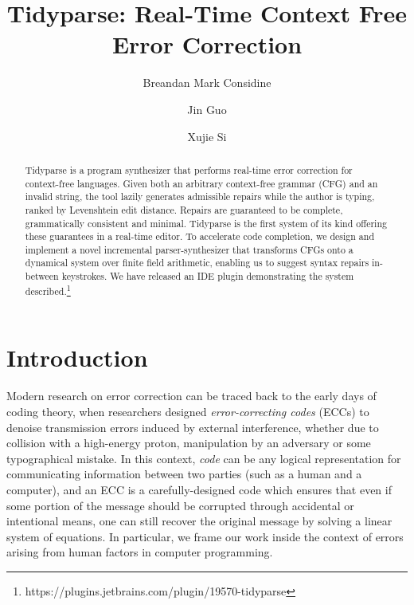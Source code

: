 \documentclass[sigplan,nonacm]{acmart}\settopmatter{printfolios=false,printccs=false,printacmref=false}
\begin{document}
\title{Tidyparse: Real-Time Context Free Error Correction}
\begin{abstract}
Tidyparse is a program synthesizer that performs real-time error correction for context-free languages.
Given both an arbitrary context-free grammar (CFG) and an invalid string, the tool lazily generates admissible repairs while the author is typing, ranked by Levenshtein edit distance.
 Repairs are guaranteed to be complete, grammatically consistent and minimal.
 Tidyparse is the first system of its kind offering these guarantees in a real-time editor. To accelerate code completion, we design and implement a novel incremental parser-synthesizer that transforms CFGs onto a dynamical system over finite field arithmetic, enabling us to suggest syntax repairs in-between keystrokes. We have released an IDE plugin demonstrating the system described.\footnote{https://plugins.jetbrains.com/plugin/19570-tidyparse}
\end{abstract}

\author{Breandan Mark Considine}

\author{Jin Guo}

\author{Xujie Si}

\maketitle

\section{Introduction}

Modern research on error correction can be traced back to the early days of coding theory, when researchers designed \textit{error-correcting codes} (ECCs) to denoise transmission errors induced by external interference, whether due to collision with a high-energy proton, manipulation by an adversary or some typographical mistake. In this context, \textit{code} can be any logical representation for communicating information between two parties (such as a human and a computer), and an ECC is a carefully-designed code which ensures that even if some portion of the message should be corrupted through accidental or intentional means, one can still recover the original message by solving a linear system of equations. In particular, we frame our work inside the context of errors arising from human factors in computer programming.
\end{document}
